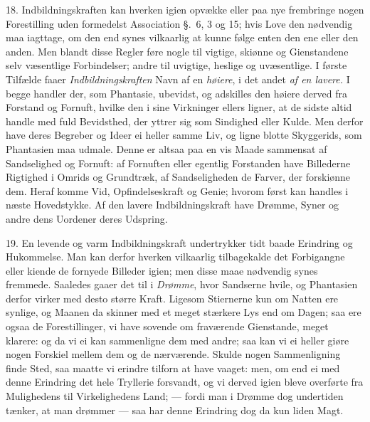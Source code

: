 \documentclass[12pt,a4paper]{article}
\newcommand{\opage}[1]{\marginnote{\footnotesize\textit{[#1]}}}
\begin{document}
\opage{126} 18. Indbildningskraften kan hverken igien opvække eller paa nye frembringe nogen
Forestilling uden formedelst Association §.~6, 3 og 15; hvis Love den nødvendig maa
iagttage, om den end synes vilkaarlig at kunne følge enten den ene eller den anden. Men
blandt disse Regler føre nogle til vigtige, skiønne og Gienstandene selv væsentlige
Forbindelser; andre til uvigtige, heslige og uvæsentlige. I første Tilfælde faaer
\emph{Indbildningskraften} Navn af en \emph{høiere}, i det andet \emph{af en lavere.} I
begge handler der, som Phantasie, ubevidst, og adskilles den høiere derved fra Forstand
og Fornuft, hvilke den i sine Virkninger ellers ligner, at de sidste altid handle med
fuld Bevidsthed, der yttrer sig som Sindighed eller Kulde. Men derfor have deres Begreber
og Ideer ei heller samme Liv, og ligne blotte Skyggerids, som Phantasien maa udmale.
Denne er altsaa paa en vis Maade sammensat af Sandselighed og Fornuft: af Fornuften eller
egentlig Forstanden have Billederne Rigtighed i Omrids og Grundtræk, af Sandseligheden de
Farver, der forskiønne dem. Heraf komme Vid, Opfindelseskraft og Genie; hvorom først kan
handles i næste Hovedstykke. Af den lavere Indbildningskraft have Drømme, Syner og andre
dens Uordener deres Udspring.

19. En levende og varm Indbildningskraft undertrykker tidt baade Erindring og Hukommelse.
Man kan derfor hverken vilkaarlig tilbagekalde det Forbigangne
\opage{127} eller kiende de fornyede Billeder igien; men disse maae nødvendig synes fremmede.
Saaledes gaaer det til i \emph{Drømme}, hvor Sandserne hvile, og Phantasien derfor virker
med desto større Kraft. Ligesom Stiernerne kun om Natten ere synlige, og Maanen da
skinner med et meget stærkere Lys end om Dagen; saa ere ogsaa de Forestillinger, vi have
sovende om fraværende Gienstande, meget klarere: og da vi ei kan sammenligne dem med
andre; saa kan vi ei heller giøre nogen Forskiel mellem dem og de nærværende. Skulde
nogen Sammenligning finde Sted, saa maatte vi erindre tilforn at have vaaget: men, om end
ei med denne Erindring det hele Tryllerie forsvandt, og vi derved igien bleve overførte
fra Mulighedens til Virkelighedens Land; --- fordi man i Drømme dog undertiden tænker, at
man drømmer --- saa har denne Erindring dog da kun liden Magt.
\end{document}

